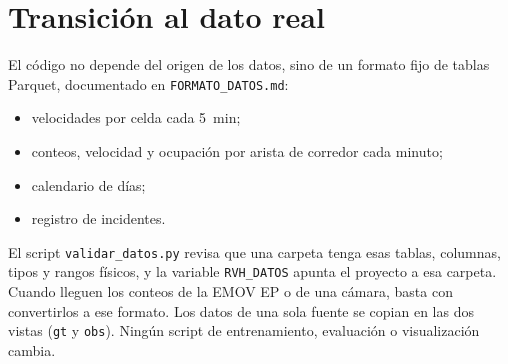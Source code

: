 \section{Transición al dato real}\label{an:transicion}
El código no depende del origen de los datos, sino de un formato fijo de tablas Parquet, documentado en \texttt{FORMATO\_DATOS.md}:
\begin{itemize}
\item velocidades por celda cada 5~min;
\item conteos, velocidad y ocupación por arista de corredor cada minuto;
\item calendario de días;
\item registro de incidentes.
\end{itemize}
El script \texttt{validar\_datos.py} revisa que una carpeta tenga esas tablas, columnas, tipos y rangos físicos, y la variable \texttt{RVH\_DATOS} apunta el proyecto a esa carpeta. Cuando lleguen los conteos de la EMOV EP o de una cámara, basta con convertirlos a ese formato. Los datos de una sola fuente se copian en las dos vistas (\texttt{gt} y \texttt{obs}). Ningún script de entrenamiento, evaluación o visualización cambia.
